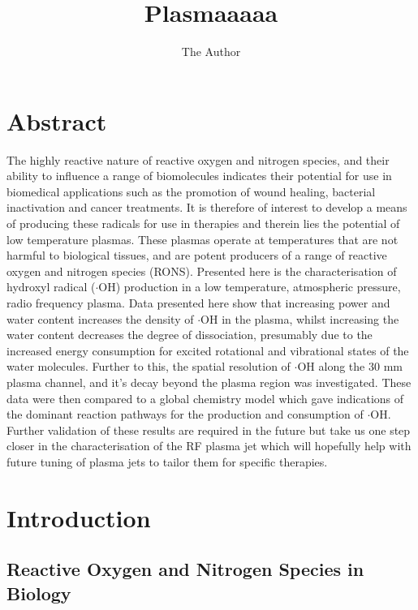 \documentclass[11pt, oneside]{article}   	%
\title{Plasmaaaaa}
\author{The Author}
\begin{document}
\maketitle

\section{Abstract}

The highly reactive nature of reactive oxygen and nitrogen species, and their ability to influence a range of biomolecules indicates their potential for use in biomedical applications such as the promotion of wound healing, bacterial inactivation and cancer treatments.
It is therefore of interest to develop a means of producing these radicals for use in therapies and therein lies the potential of low temperature plasmas.
These plasmas operate at temperatures that are not harmful to biological tissues, and are potent producers of a range of reactive oxygen and nitrogen species (RONS).
Presented here is the characterisation of hydroxyl radical ($\cdot$OH) production in a low temperature, atmospheric pressure, radio frequency plasma.
Data presented here show that increasing power and water content increases the density of $\cdot$OH in the plasma, whilst increasing the water content decreases the degree of dissociation, presumably due to the increased energy consumption for excited rotational and vibrational states of the water molecules.
Further to this, the spatial resolution of $\cdot$OH along the 30 mm plasma channel, and it's decay beyond the plasma region was investigated. These data were then compared to a global chemistry model which gave indications of the dominant reaction pathways for the production and consumption of $\cdot$OH.
Further validation of these results are required in the future but take us one step closer in the characterisation of the RF plasma jet which will hopefully help with future tuning of plasma jets to tailor them for specific therapies.

\section{Introduction}

\subsection{Reactive Oxygen and Nitrogen Species in Biology} \label{sec:RONSinBiology}
\end{document}
